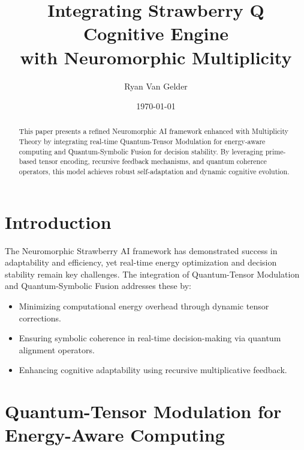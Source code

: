 \documentclass{article}
\theoremstyle{plain}
\begin{document}
\title{Integrating Strawberry Q Cognitive Engine \\ with Neuromorphic Multiplicity}
\author{Ryan Van Gelder}
\date{\today}

\maketitle

\begin{abstract}
This paper presents a refined Neuromorphic AI framework enhanced with Multiplicity Theory by integrating real-time Quantum-Tensor Modulation for energy-aware computing and Quantum-Symbolic Fusion for decision stability. By leveraging prime-based tensor encoding, recursive feedback mechanisms, and quantum coherence operators, this model achieves robust self-adaptation and dynamic cognitive evolution.
\end{abstract}

\section{Introduction}
The Neuromorphic Strawberry AI framework has demonstrated success in adaptability and efficiency, yet real-time energy optimization and decision stability remain key challenges. The integration of Quantum-Tensor Modulation and Quantum-Symbolic Fusion addresses these by:
\begin{itemize}
    \item Minimizing computational energy overhead through dynamic tensor corrections.
    \item Ensuring symbolic coherence in real-time decision-making via quantum alignment operators.
    \item Enhancing cognitive adaptability using recursive multiplicative feedback.
\end{itemize}

\section{Quantum-Tensor Modulation for Energy-Aware Computing}
\end{document}
